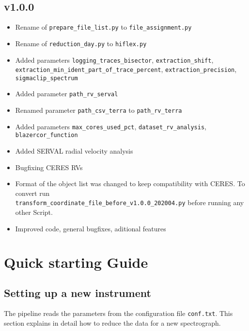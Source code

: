 \documentclass[10pt,a4paper]{article}
\begin{document}
\subsection*{v1.0.0}
\begin{itemize}\setlength\itemsep{0em}
  \item Rename of \verb|prepare_file_list.py| to \verb|file_assignment.py|
  \item Rename of \verb|reduction_day.py| to \verb|hiflex.py|
  \item Added parameters \verb|logging_traces_bisector|, \verb|extraction_shift|, \verb|extraction_min_ident_part_of_trace_percent|, \verb|extraction_precision|, \verb|sigmaclip_spectrum|
  \item Added parameter \verb|path_rv_serval|
  \item Renamed parameter \verb|path_csv_terra| to \verb|path_rv_terra|
  \item Added parameters \verb|max_cores_used_pct|, \verb|dataset_rv_analysis|, \verb|blazercor_function|
  \item Added SERVAL radial velocity analysis
  \item Bugfixing CERES RVs
  \item Format of the object list was changed to keep compatibility with CERES. To convert run \\ \verb|transform_coordinate_file_before_v1.0.0_202004.py| before running any other Script. %
  \item Improved code, general bugfixes, aditional features
\end{itemize}

\section{Quick starting Guide}

\subsection{Setting up a new instrument}
\label{Section:first_configuration}
The pipeline reads the parameters from the configuration file \verb|conf.txt|. This section explains in detail how to reduce the data for a new spectrograph.
\end{document}
